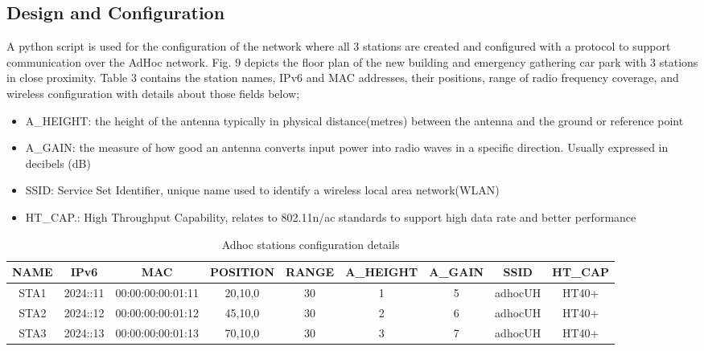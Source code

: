 \documentclass{article}
\begin{document}
\subsection{Design and Configuration}
A python script is used for the configuration of the network where all 3 stations are created and configured with a protocol to support communication over the AdHoc network. Fig. 9 depicts the floor plan of the new building and emergency gathering car park with 3 stations in close proximity. Table 3 contains the station names, IPv6 and MAC addresses, their positions, range of radio frequency coverage, and wireless configuration with details about those fields below; 
	\begin{itemize}
		\item A\_HEIGHT: the height of the antenna typically in physical distance(metres) between the antenna and the ground or reference point
		\item A\_GAIN: the measure of how good an antenna converts input power into radio waves in a specific direction. Usually expressed in decibels (dB)
		\item SSID: Service Set Identifier, unique name used to identify a wireless local area network(WLAN)
		\item HT\_CAP.: High Throughput Capability, relates to 802.11n/ac standards to support high data rate and better performance 
	\end{itemize}
    	\begin{table}[h]
        		\begin{tabular}{|c|c|c|c|c|c|c|c|c|}
        			\hline
        			NAME & IPv6 & MAC & POSITION & RANGE & A\_HEIGHT & A\_GAIN & SSID & HT\_CAP\\
        			\hline
        			STA1 & 2024::11 & 00:00:00:00:01:11 & 20,10,0 & 30 & 1 & 5 & adhocUH & HT40+ \\
        			STA2 & 2024::12 & 00:00:00:00:01:12 & 45,10,0 & 30 & 2 & 6 & adhocUH & HT40+ \\
        			STA3 & 2024::13 & 00:00:00:00:01:13 & 70,10,0 & 30 & 3 & 7 & adhocUH & HT40+ \\
        			\hline
        		\end{tabular}
       	 	\caption{Adhoc stations configuration details}
        		\label{tab:3}
    	\end{table}
\newpage
\end{document}

